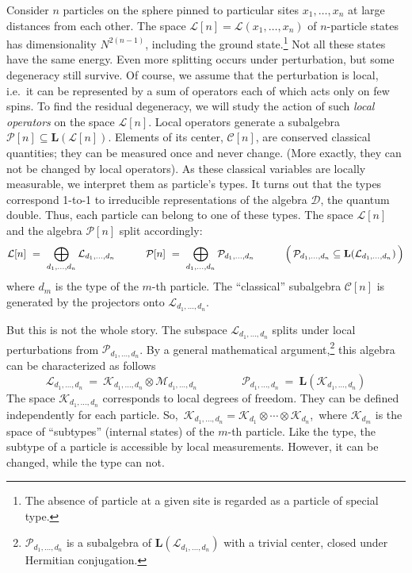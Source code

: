 \documentclass[12pt]{article}
\newcommand{\LL}{\mathbf{L}}
\newcommand{\calC}{\mathcal{C}}
\newcommand{\calD}{\mathcal{D}}
\newcommand{\calK}{\mathcal{K}}
\newcommand{\calL}{\mathcal{L}}
\newcommand{\calM}{\mathcal{M}}
\newcommand{\calP}{\mathcal{P}}
\begin{document}
Consider $n$ particles on the sphere pinned to particular sites
$x_1,\ldots,x_n$ at large distances from each other. The space
$\calL[n]=\calL(x_1,\ldots,x_n)$ of $n$-particle states has dimensionality
$N^{2(n-1)}$, including the ground state.\footnote{ The absence of particle at
a given site is regarded as a particle of special type.}  Not all these states
have the same energy. Even more splitting occurs under perturbation, but some
degeneracy still survive. Of course, we assume that the perturbation is local,
i.e.\ it can be represented by a sum of operators each of which acts only on
few spins. To find the residual degeneracy, we will study the action of such
\emph{local operators} on the space $\calL[n]$.  Local operators generate a
subalgebra $\calP[n]\subseteq\LL(\calL[n])$.  Elements of its center,
$\calC[n]$, are conserved classical quantities; they can be measured once and
never change. (More exactly, they can not be changed by local operators). As
these classical variables are locally measurable, we interpret them as
particle's types.  It turns out that the types correspond 1-to-1 to
irreducible representations of the algebra $\calD$, the quantum double. Thus,
each particle can belong to one of these types. The space $\calL[n]$ and the
algebra $\calP[n]$ split accordingly:
\begin{equation} 
  \calL[n]\ =\ \bigoplus_{d_1,\ldots,d_n} \calL_{d_1,\ldots,d_n}
  \qquad\quad
  \calP[n]\ =\ \bigoplus_{d_1,\ldots,d_n} \calP_{d_1,\ldots,d_n}
  \qquad\quad \Bigl(\, 
     \calP_{d_1,\ldots,d_n} \subseteq \LL(\calL_{d_1,\ldots,d_n})
  \,\Bigr)
\end{equation} 
where $d_m$ is the type of the $m$-th particle. The ``classical'' subalgebra  
$\calC[n]$ is generated by the projectors onto 
$\calL_{d_1,\ldots,d_n}$.

But this is not the whole story. The subspace $\calL_{d_1,\ldots,d_n}$ 
splits under local perturbations from $\calP_{d_1,\ldots,d_n}$. 
By a general mathematical argument,\footnote{
  $\calP_{d_1,\ldots,d_n}$ is a subalgebra of 
  $\LL(\calL_{d_1,\ldots,d_n})$ with a trivial center, 
  closed under Hermitian conjugation.}
this algebra can be characterized as follows
\begin{equation}
  \calL_{d_1,\ldots,d_n}\ =\ 
  \calK_{d_1,\ldots,d_n} \otimes \calM_{d_1,\ldots,d_n}
  \qquad\qquad
  \calP_{d_1,\ldots,d_n}\ =\ \LL(\calK_{d_1,\ldots,d_n})
\end{equation}
The space $\calK_{d_1,\ldots,d_n}$ corresponds to local degrees of 
freedom. They can be defined independently for each particle. So,\, 
$\calK_{d_1,\ldots,d_n}=\calK_{d_1}\otimes\cdots\otimes\calK_{d_n}$,\,
where $\calK_{d_m}$ is the space of ``subtypes'' (internal states) of the 
$m$-th particle. Like the type, the subtype of a particle is accessible by 
local measurements. However, it can be changed, while the type can not. 
\end{document}
